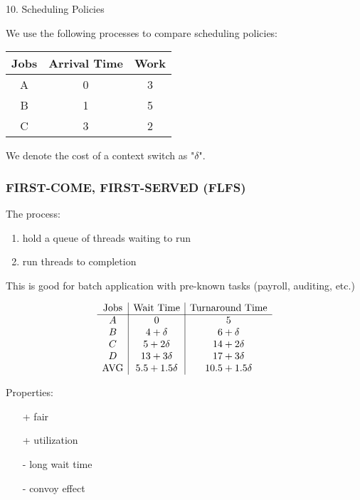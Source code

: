 \documentclass[../../lecture_notes.tex]{subfiles}
\begin{document}
10. Scheduling Policies

We use the following processes to compare scheduling policies:
\begin{center}
\begin{tabular}{ | c | c | c | }
	\hline
	Jobs & Arrival Time & Work \\
	\hline\hline
	A & 0 & 3 \\
	\hline
	B & 1 & 5 \\
	\hline
	C & 3 & 2 \\
	\hline
\end{tabular}
\end{center}


We denote the cost of a context switch as "$\delta$".

\subsubsection*{FIRST-COME, FIRST-SERVED (FLFS)}
The process:
	\begin{enumerate}
	\item hold a queue of threads waiting to run
	\item run threads to completion
	\end{enumerate}
This is good for batch application with pre-known tasks (payroll, auditing, etc.)

\begin{minipage}{0.5\linewidth}
\[ \begin{array} { c | c | c }
	\text{Jobs} & \text{Wait Time} & \text{Turnaround Time} \\
	\hline
	A & 0 & 5 \\
	B & 4 + \delta & 6 + \delta \\
	C & 5 + 2\delta & 14 + 2\delta \\
	D & 13 + 3\delta & 17 + 3\delta \\
	\text{AVG} & 5.5 + 1.5\delta & 10.5 + 1.5\delta
\end{array} \]
\end{minipage}%
\begin{minipage}{0.5\linewidth}

Properties:
\begin{enumerate}[nosep]
\item[+] fair
\item[+] utilization
\item[-]  long wait time
\item[-] convoy effect
\end{enumerate}
\end{minipage}
\end{document}
